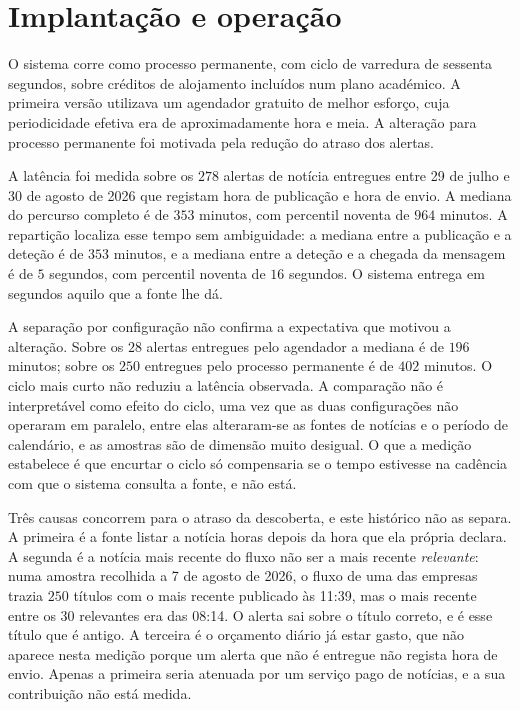 \section{Implantação e operação}
\label{sec:sis_operacao}

O sistema corre como processo permanente, com ciclo de varredura de sessenta segundos, sobre
créditos de alojamento incluídos num plano académico. A primeira versão utilizava um agendador
gratuito de melhor esforço, cuja periodicidade efetiva era de aproximadamente hora e meia. A
alteração para processo permanente foi motivada pela redução do atraso dos alertas.

A latência foi medida sobre os $278$ alertas de notícia entregues entre 29 de julho e 30 de agosto
de 2026 que registam hora de publicação e hora de envio. A mediana do percurso completo é de $353$
minutos, com percentil noventa de $964$ minutos. A repartição localiza esse tempo sem ambiguidade:
a mediana entre a publicação e a deteção é de $353$ minutos, e a mediana entre a deteção e a
chegada da mensagem é de $5$ segundos, com percentil noventa de $16$ segundos. O sistema entrega em
segundos aquilo que a fonte lhe dá.

A separação por configuração não confirma a expectativa que motivou a alteração. Sobre os $28$
alertas entregues pelo agendador a mediana é de $196$ minutos; sobre os $250$ entregues pelo
processo permanente é de $402$ minutos. O ciclo mais curto não reduziu a latência observada. A
comparação não é interpretável como efeito do ciclo, uma vez que as duas configurações não
operaram em paralelo, entre elas alteraram-se as fontes de notícias e o período de calendário, e
as amostras são de dimensão muito desigual. O que a medição estabelece é que encurtar o ciclo só
compensaria se o tempo estivesse na cadência com que o sistema consulta a fonte, e não está.

Três causas concorrem para o atraso da descoberta, e este histórico não as separa. A primeira é a
fonte listar a notícia horas depois da hora que ela própria declara. A segunda é a notícia mais
recente do fluxo não ser a mais recente \emph{relevante}: numa amostra recolhida a 7 de agosto de
2026, o fluxo de uma das empresas trazia $250$ títulos com o mais recente publicado às 11:39, mas
o mais recente entre os $30$ relevantes era das 08:14. O alerta sai sobre o título correto, e é
esse título que é antigo. A terceira é o orçamento diário já estar gasto, que não aparece nesta
medição porque um alerta que não é entregue não regista hora de envio. Apenas a primeira seria
atenuada por um serviço pago de notícias, e a sua contribuição não está medida.

